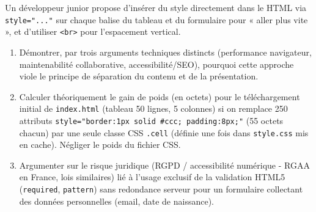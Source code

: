 \documentclass[11pt]{article}
\begin{document}
\begin{exercice}
\label{exo:synthese}
Un développeur junior propose d'insérer du style directement dans le HTML via \texttt{style="..."} sur chaque balise du tableau et du formulaire pour « aller plus vite », et d'utiliser \texttt{<br>} pour l'espacement vertical.

\begin{enumerate}
    \item Démontrer, par trois arguments techniques distincts (performance navigateur, maintenabilité collaborative, accessibilité/SEO), pourquoi cette approche viole le principe de séparation du contenu et de la présentation.
    \item Calculer théoriquement le gain de poids (en octets) pour le téléchargement initial de \texttt{index.html} (tableau 50 lignes, 5 colonnes) si on remplace 250 attributs \texttt{style="border:1px solid \#ccc; padding:8px;"} (55 octets chacun) par une seule classe CSS \texttt{.cell} (définie une fois dans \texttt{style.css} mis en cache). Négliger le poids du fichier CSS.
    \item Argumenter sur le risque juridique (RGPD / accessibilité numérique - RGAA en France, lois similaires) lié à l'usage exclusif de la validation HTML5 (\texttt{required}, \texttt{pattern}) sans redondance serveur pour un formulaire collectant des données personnelles (email, date de naissance).
\end{enumerate}
\end{exercice}
\end{document}
